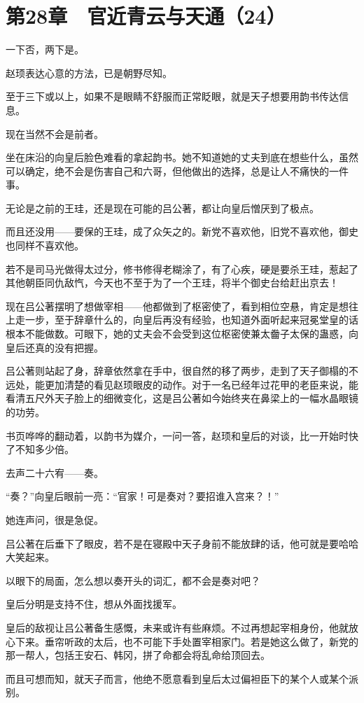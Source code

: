 \section{第28章　官近青云与天通（24）}

一下否，两下是。

赵顼表达心意的方法，已是朝野尽知。

至于三下或以上，如果不是眼睛不舒服而正常眨眼，就是天子想要用韵书传达信息。

现在当然不会是前者。

坐在床沿的向皇后脸色难看的拿起韵书。她不知道她的丈夫到底在想些什么，虽然可以确定，绝不会是伤害自己和六哥，但他做出的选择，总是让人不痛快的一件事。

无论是之前的王珪，还是现在可能的吕公著，都让向皇后憎厌到了极点。

而且还没用——要保的王珪，成了众矢之的。新党不喜欢他，旧党不喜欢他，御史也同样不喜欢他。

若不是司马光做得太过分，修书修得老糊涂了，有了心疾，硬是要杀王珪，惹起了其他朝臣同仇敌忾，今天也不至于为了一个王珪，将半个御史台给赶出京去！

现在吕公著摆明了想做宰相——他都做到了枢密使了，看到相位空悬，肯定是想往上走一步，至于辞章什么的，向皇后再没有经验，也知道外面听起来冠冕堂皇的话根本不能做数。可眼下，她的丈夫会不会受到这位枢密使兼太齤子太保的蛊惑，向皇后还真的没有把握。

吕公著则站起了身，辞章依然拿在手中，很自然的移了两步，走到了天子御榻的不远处，能更加清楚的看见赵顼眼皮的动作。对于一名已经年过花甲的老臣来说，能看清五尺外天子脸上的细微变化，这是吕公著如今始终夹在鼻梁上的一幅水晶眼镜的功劳。

书页哗哗的翻动着，以韵书为媒介，一问一答，赵顼和皇后的对谈，比一开始时快了不知多少倍。

去声二十六宥——奏。

“奏？”向皇后眼前一亮：“官家！可是奏对？要招谁入宫来？！”

她连声问，很是急促。

吕公著在后垂下了眼皮，若不是在寝殿中天子身前不能放肆的话，他可就是要哈哈大笑起来。

以眼下的局面，怎么想以奏开头的词汇，都不会是奏对吧？

皇后分明是支持不住，想从外面找援军。

皇后的敌视让吕公著备生感慨，未来或许有些麻烦。不过再想起宰相身份，他就放心下来。垂帘听政的太后，也不可能下手处置宰相家门。若是她这么做了，新党的那一帮人，包括王安石、韩冈，拼了命都会将乱命给顶回去。

而且可想而知，就天子而言，他绝不愿意看到皇后太过偏袒臣下的某个人或某个派别。

